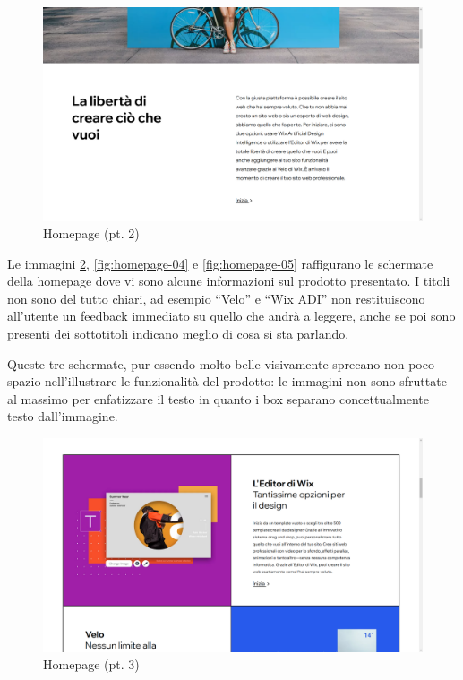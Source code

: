 \documentclass[11pt,a4paper]{article}
\begin{document}
\begin{figure}[H]
  \centering
  \includegraphics[width=1\textwidth]{img/homepage-02.png}
  \caption{Homepage (pt. 2)}
  \label{fig:homepage-02}
\end{figure}

Le immagini \ref{fig:homepage-03}, \ref{fig:homepage-04} e
\ref{fig:homepage-05} raffigurano le schermate della homepage dove vi
sono alcune informazioni sul prodotto presentato. I titoli non sono
del tutto chiari, ad esempio ``Velo'' e ``Wix ADI'' non restituiscono
all'utente un feedback immediato su quello che andrà a leggere, anche
se poi sono presenti dei sottotitoli indicano meglio di cosa si sta
parlando. 

Queste tre schermate, pur essendo molto belle visivamente sprecano non
poco spazio nell'illustrare le funzionalità del prodotto: le immagini
non sono sfruttate al massimo per enfatizzare il testo in quanto i box
separano concettualmente testo dall'immagine.

\begin{figure}[H]
  \centering
  \includegraphics[width=1\textwidth]{img/homepage-03.png}
  \caption{Homepage (pt. 3)}
  \label{fig:homepage-03}
\end{figure}
\end{document}
